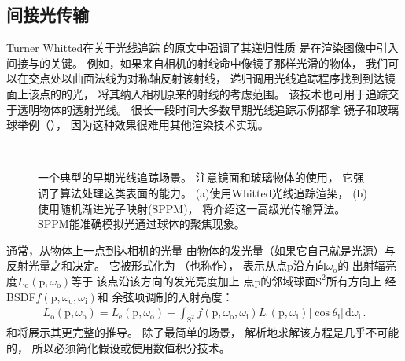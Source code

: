 \subsection{间接光传输}\label{sub:间接光传输}

Turner Whitted在关于光线追踪
的原文中\citep{10.1145/358876.358882}强调了其递归性质
是在渲染图像中引入间接与的关键。
例如，如果来自相机的射线命中像镜子那样光滑的物体，
我们可以在交点处以曲面法线为对称轴反射该射线，
递归调用光线追踪程序找到到达镜面上该点的的光，
将其纳入相机原来的射线的考虑范围。
该技术也可用于追踪交于透明物体的透射光线。
很长一段时间大多数早期光线追踪示例都拿
镜子和玻璃球举例（），
因为这种效果很难用其他渲染技术实现。
\begin{figure}
      \centering
      \\
      \caption{一个典型的早期光线追踪场景。
            注意镜面和玻璃物体的使用，
            它强调了算法处理这类表面的能力。
            (a)使用Whitted光线追踪渲染，
            (b)使用随机渐进光子映射(SPPM)，
            将介绍这一高级光传输算法。
            SPPM能准确模拟光通过球体的聚焦现象。}\label{fig:1.7}
\end{figure}

通常，从物体上一点到达相机的光量
由物体的发光量（如果它自己就是光源）与反射光量之和决定。
它被形式化为
（也称作），
表示从点p沿方向$\omega_\mathrm{o}$的
出射辐亮度$L_{\mathrm{o}}(\mathrm{p},\omega_\mathrm{o})$等于
该点沿该方向的发光亮度加上
点p的邻域球面$\mathrm{S}^2$所有方向上
经BSDF$f(\mathrm{p},\omega_\mathrm{o},\omega_\mathrm{i})$和
余弦项调制的入射亮度：
\begin{align}
      L_{\mathrm{o}}(\mathrm{p},\omega_\mathrm{o})=L_{\mathrm{e}}(\mathrm{p},\omega_\mathrm{o})+\int_{\mathrm{S}^2}f(\mathrm{p},\omega_\mathrm{o},\omega_\mathrm{i})L_{\mathrm{i}}(\mathrm{p},\omega_\mathrm{i})|\cos{\theta_{\mathrm{i}}}| \,\mathrm{d}\omega_\mathrm{i}\, .
      \label{eq:1.1}
\end{align}
和将展示其更完整的推导。
除了最简单的场景，
解析地求解该方程是几乎不可能的，
所以必须简化假设或使用数值积分技术。

